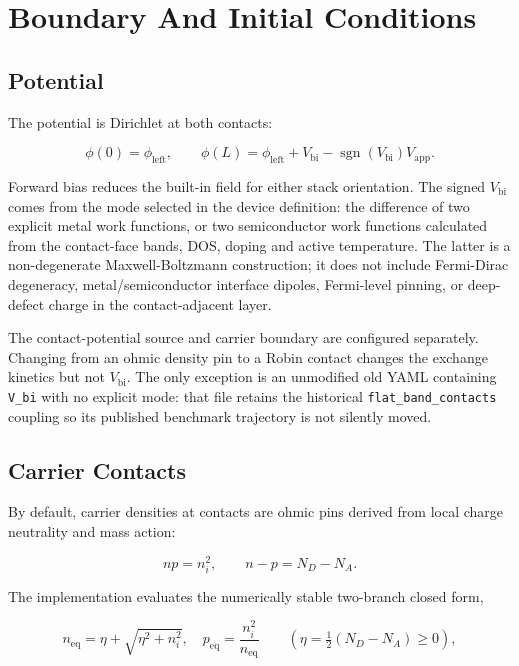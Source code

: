 \documentclass[
  11pt,
  american,
]{report}
\begin{document}
\hypertarget{boundary-and-initial-conditions}{%
\chapter{Boundary And Initial
Conditions}\label{boundary-and-initial-conditions}}

\hypertarget{potential}{%
\section{Potential}\label{potential}}

The potential is Dirichlet at both contacts:

\[
\phi(0)=\phi_\mathrm{left},
\qquad
\phi(L)=\phi_\mathrm{left}+V_\mathrm{bi}
-\operatorname{sgn}(V_\mathrm{bi})V_\mathrm{app}.
\]

Forward bias reduces the built-in field for either stack orientation.
The signed \(V_\mathrm{bi}\) comes from the mode selected in the device
definition: the difference of two explicit metal work functions, or two
semiconductor work functions calculated from the contact-face bands,
DOS, doping and active temperature. The latter is a non-degenerate
Maxwell-Boltzmann construction; it does not include Fermi-Dirac
degeneracy, metal/semiconductor interface dipoles, Fermi-level pinning,
or deep-defect charge in the contact-adjacent layer.

The contact-potential source and carrier boundary are configured
separately. Changing from an ohmic density pin to a Robin contact
changes the exchange kinetics but not \(V_\mathrm{bi}\). The only
exception is an unmodified old YAML containing \texttt{V\_bi} with no
explicit mode: that file retains the historical
\texttt{flat\_band\_contacts} coupling so its published benchmark
trajectory is not silently moved.

\hypertarget{carrier-contacts}{%
\section{Carrier Contacts}\label{carrier-contacts}}

By default, carrier densities at contacts are ohmic pins derived from
local charge neutrality and mass action:

\[
np=n_i^2, \qquad n-p=N_D-N_A.
\]

The implementation evaluates the numerically stable two-branch closed
form,

\[
n_\mathrm{eq} = \eta+\sqrt{\eta^2+n_i^2},
\quad
p_\mathrm{eq} = \frac{n_i^2}{n_\mathrm{eq}}
\qquad
\left(\eta = \tfrac{1}{2}(N_D-N_A) \geq 0\right),
\]
\end{document}
